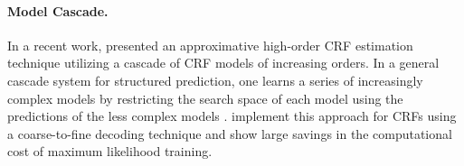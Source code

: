\documentclass[smallextended]{svjour3}       %
\begin{document}



\paragraph{Model Cascade.}
\label{sec: estimation using cascaded models}

In a recent work, \citet{muller2013} presented an approximative high-order CRF estimation technique utilizing a cascade of CRF models of increasing orders. In a general cascade system for structured prediction, one learns a series of increasingly complex models by restricting the search space of each model using the predictions of the less complex models \citep{weiss2010}. 
 \citet{muller2013} implement this approach for CRFs using a coarse-to-fine decoding technique \citep{charniak2005,rush2012} and show large savings in the computational cost of maximum likelihood training. 
\end{document}
